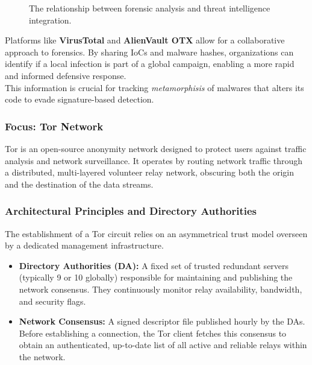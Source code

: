 \begin{figure}[H]
\centering
{}
\caption{The relationship between forensic analysis and threat intelligence integration.}
\end{figure}

\noindent
Platforms like \textbf{VirusTotal} and \textbf{AlienVault OTX} allow for a collaborative approach to forensics. By sharing IoCs and malware hashes, organizations can identify if a local infection is part of a global campaign, enabling a more rapid and informed defensive response. \\
This information is crucial for tracking \textit{metamorphisis} of malwares that alters its code to evade signature-based detection.

\subsubsection{Focus: Tor Network}

Tor is an open-source anonymity network designed to protect users against traffic analysis and network surveillance. It operates by routing network traffic through a distributed, multi-layered volunteer relay network, obscuring both the origin and the destination of the data streams.

\subsubsection*{Architectural Principles and Directory Authorities}
The establishment of a Tor circuit relies on an asymmetrical trust model overseen by a dedicated management infrastructure.
\begin{itemize}
    \item \textbf{Directory Authorities (DA):} A fixed set of trusted redundant servers (typically 9 or 10 globally) responsible for maintaining and publishing the network consensus. They continuously monitor relay availability, bandwidth, and security flags.
    \item \textbf{Network Consensus:} A signed descriptor file published hourly by the DAs. Before establishing a connection, the Tor client fetches this consensus to obtain an authenticated, up-to-date list of all active and reliable relays within the network.
\end{itemize}

